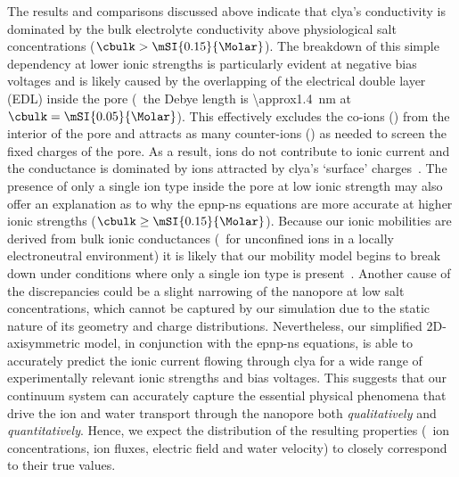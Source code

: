 The results and comparisons discussed above indicate that \gls{clya}'s conductivity is dominated by the bulk
electrolyte conductivity above physiological salt concentrations ($\cbulk > \mSI{0.15}{\Molar}$). The
breakdown of this simple dependency at lower ionic strengths is particularly evident at negative bias voltages
and is likely caused by the overlapping of the electrical double layer (EDL) inside the pore (\ie~the Debye
length is \SI{\approx1.4}{\nm} at $\cbulk=\mSI{0.05}{\Molar}$). This effectively excludes the co-ions (\Cl)
from the interior of the pore and attracts as many counter-ions (\Na) as needed to screen the fixed charges of
the pore. As a result, \Cl{} ions do not contribute to ionic current and the conductance is dominated by \Na{}
ions attracted by \gls{clya}'s `surface' charges~\cite{Uematsu-2018}. The presence of only a single ion type
inside the pore at low ionic strength may also offer an explanation as to why the \gls{epnp-ns} equations are
more accurate at higher ionic strengths ($\cbulk\ge\mSI{0.15}{\Molar}$). Because our ionic mobilities are
derived from bulk ionic conductances (\ie~for unconfined ions in a locally electroneutral environment) it is
likely that our mobility model begins to break down under conditions where only a single ion type is
present~\cite{Duan-2010}. Another cause of the discrepancies could be a slight narrowing of the nanopore at
low salt concentrations, which cannot be captured by our simulation due to the static nature of its geometry
and charge distributions. Nevertheless, our simplified 2D-axisymmetric model, in conjunction with the
\gls{epnp-ns} equations, is able to accurately predict the ionic current flowing through \gls{clya} for a wide
range of experimentally relevant ionic strengths and bias voltages. This suggests that our continuum system
can accurately capture the essential physical phenomena that drive the ion and water transport through the
nanopore both \emph{qualitatively} and \emph{quantitatively}. Hence, we expect the distribution of the
resulting properties (\eg~ion concentrations, ion fluxes, electric field and water velocity) to closely
correspond to their true values.

